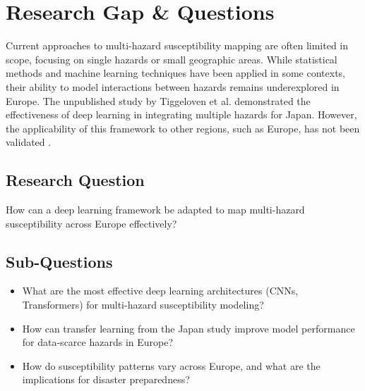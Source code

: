 \section{Research Gap \& Questions}
\label{sec:gap-and-questions}

Current approaches to multi-hazard susceptibility mapping are often limited in scope, focusing on single hazards or small geographic areas. \cite{Pourghasemi} While statistical methods and machine learning techniques have been applied in some contexts, their ability to model interactions between hazards remains underexplored in Europe. The unpublished study by Tiggeloven et al. demonstrated the effectiveness of deep learning in integrating multiple hazards for Japan. However, the applicability of this framework to other regions, such as Europe, has not been validated \cite{SAKICTROGRLIC2024103774}.

\subsection{Research Question}
How can a deep learning framework be adapted to map multi-hazard susceptibility across Europe effectively?

\subsection{Sub-Questions}
\begin{itemize}
    \item What are the most effective deep learning architectures (CNNs, Transformers) for multi-hazard susceptibility modeling?
	\item How can transfer learning from the Japan study improve model performance for data-scarce hazards in Europe?
	\item How do susceptibility patterns vary across Europe, and what are the implications for disaster preparedness?
\end{itemize}